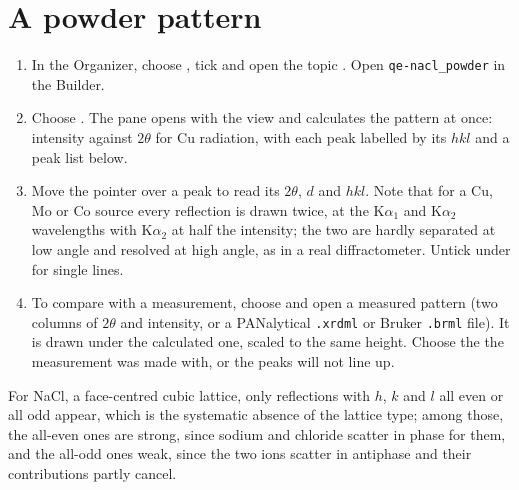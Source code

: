 \section{A powder pattern}
\begin{enumerate}
	\item In the Organizer, choose , tick  and open the topic . Open \texttt{qe-nacl\_powder} in the Builder.
	\item Choose . The pane opens with the  view and calculates the pattern at once: intensity against $2\theta$ for Cu radiation, with each peak labelled by its $hkl$ and a peak list below.
	\item Move the pointer over a peak to read its $2\theta$, $d$ and $hkl$. Note that for a Cu, Mo or Co source every reflection is drawn twice, at the K$\alpha_1$ and K$\alpha_2$ wavelengths with K$\alpha_2$ at half the intensity; the two are hardly separated at low angle and resolved at high angle, as in a real diffractometer. Untick  under  for single lines.
	\item To compare with a measurement, choose  and open a measured pattern (two columns of $2\theta$ and intensity, or a PANalytical \texttt{.xrdml} or Bruker \texttt{.brml} file). It is drawn under the calculated one, scaled to the same height. Choose the  the measurement was made with, or the peaks will not line up.
\end{enumerate}

For NaCl, a face-centred cubic lattice, only reflections with $h$, $k$ and $l$ all even or all odd appear, which is the systematic absence of the lattice type; among those, the all-even ones are strong, since sodium and chloride scatter in phase for them, and the all-odd ones weak, since the two ions scatter in antiphase and their contributions partly cancel.

